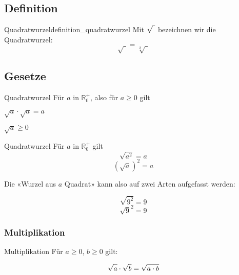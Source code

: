 \newpage

\subsection{Definition}
\begin{definition}{Quadratwurzel}{definition_quadratwurzel}
Mit $\sqrt{\vphantom{b} \,\,}$ bezeichnen wir die
Quadratwurzel:
$$\sqrt{\,\,}  = \sqrt[2]{\,\,}$$
\end{definition}


\subsection{Gesetze}

\begin{definition}{Quadratwurzel}{}
Für $a$ in $\mathbb{R}_0^{+}$, also für $a\ge 0$ gilt

$\sqrt{a} \cdot \sqrt{a} = a$

$\sqrt{a} \ge 0$
\end{definition}



\begin{gesetz}{Quadratwurzel}{}
Für $a$ in $\mathbb{R}_0^{+}$ gilt
$$\sqrt{a^2} = a$$
$$(\sqrt{a})^2 = a$$
\end{gesetz}


Die «Wurzel aus $a$ Quadrat» kann also auf zwei Arten aufgefasst werden:


\begin{beispiel}{}{}
$$\sqrt{9^2}=9$$
$$\sqrt{9}^2 = 9$$
\end{beispiel}





\newpage
\subsubsection{Multiplikation}

\begin{gesetz}{Multiplikation}{}
  Für $a\ge 0$, $b\ge 0$ gilt:
 
$$\sqrt{\vphantom{b}a}\cdot{\sqrt{b}} = \sqrt{\vphantom{b}a\cdot{b}}$$

\end{gesetz}


